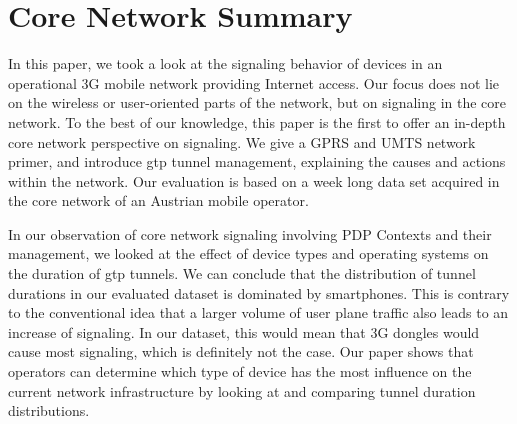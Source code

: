 



















\section{Core Network Summary}
\label{c4:sec:conclusion}


In this paper, we took a look at the signaling behavior of devices in an operational \gls{3G} mobile network providing Internet access. Our focus does not lie on the wireless or user-oriented parts of the network, but on signaling in the core network. To the best of our knowledge, this paper is the first to offer an in-depth core network perspective on signaling. We give a \gls{GPRS} and \gls{UMTS} network primer, and introduce \gls{gtp} tunnel management, explaining the causes and actions within the network. Our evaluation is based on a week long data set acquired in the core network of an Austrian mobile operator.



In our observation of core network signaling involving \gls{PDP} Contexts and their management, we looked at the effect of device types and operating systems on the duration of \gls{gtp} tunnels. We can conclude that the distribution of tunnel durations in our evaluated dataset is dominated by smartphones. This is contrary to the conventional idea that a larger volume of user plane traffic also leads to an increase of signaling. In our dataset, this would mean that 3G dongles would cause most signaling, which is definitely not the case. Our paper shows that operators can determine which type of device has the most influence on the current network infrastructure by looking at and comparing tunnel duration distributions.

